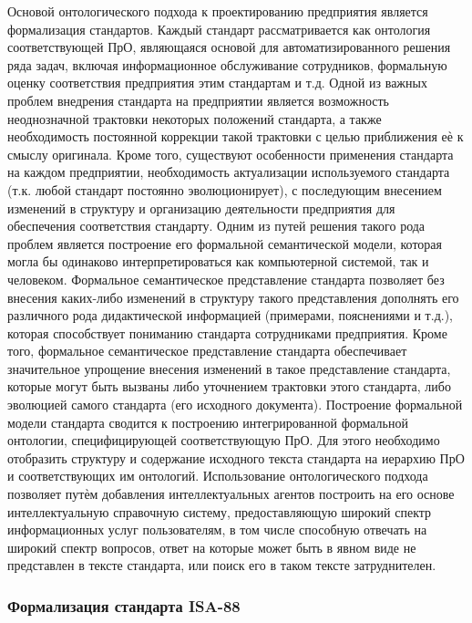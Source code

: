 Основой онтологического подхода к проектированию предприятия является формализация стандартов. Каждый стандарт рассматривается как онтология соответствующей ПрО, являющаяся основой для автоматизированного решения ряда задач, включая информационное обслуживание сотрудников, формальную оценку соответствия предприятия этим стандартам и т.д.
Одной из важных проблем внедрения стандарта на предприятии является возможность неоднозначной трактовки некоторых положений стандарта, а также необходимость постоянной коррекции такой трактовки с целью приближения еѐ к смыслу оригинала. Кроме того, существуют особенности применения стандарта на каждом предприятии, необходимость актуализации используемого стандарта (т.к. любой стандарт постоянно эволюционирует), с последующим внесением изменений в структуру и организацию деятельности предприятия для
обеспечения соответствия стандарту.
Одним из путей решения такого рода проблем является построение его формальной семантической модели, которая могла бы одинаково интерпретироваться как компьютерной системой, так и человеком. Формальное семантическое представление стандарта позволяет без внесения каких-либо изменений в структуру такого представления дополнять его различного рода  дидактической информацией (примерами, пояснениями и т.д.), которая способствует пониманию стандарта сотрудниками предприятия. Кроме того, формальное семантическое представление стандарта обеспечивает значительное упрощение внесения изменений в такое представление стандарта, которые могут быть вызваны либо уточнением трактовки этого стандарта, либо эволюцией самого стандарта (его исходного документа).
Построение формальной модели стандарта сводится к построению интегрированной формальной онтологии, специфицирующей соответствующую ПрО. Для этого необходимо отобразить структуру и содержание исходного текста стандарта на иерархию ПрО и соответствующих им онтологий.
Использование онтологического подхода позволяет путѐм добавления интеллектуальных агентов построить на его основе интеллектуальную справочную систему, предоставляющую широкий спектр информационных услуг пользователям, в том числе способную отвечать на широкий спектр вопросов, ответ на которые может быть в явном виде не представлен в тексте стандарта, или поиск его в таком тексте затруднителен.

\subsubsection{Формализация стандарта ISA-88}
\label{sec_chapter_enterprise_isa88}

